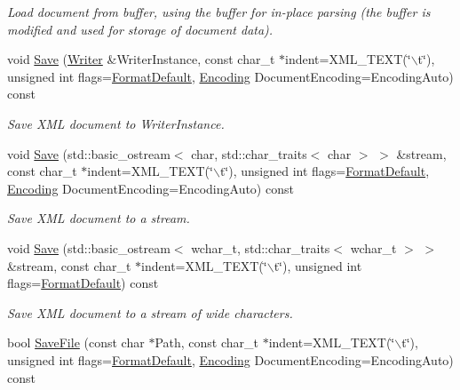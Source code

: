 \begin{DoxyCompactItemize}
\begin{DoxyCompactList}\small\item\em Load document from buffer, using the buffer for in-\/place parsing (the buffer is modified and used for storage of document data). \item\end{DoxyCompactList}\item 
void \hyperlink{classphys_1_1xml_1_1Document_a1e3761e11294b3d526ff13d76ee8be0d}{Save} (\hyperlink{classphys_1_1xml_1_1Writer}{Writer} \&WriterInstance, const char\_\-t $\ast$indent=XML\_\-TEXT(\char`\"{}$\backslash$t\char`\"{}), unsigned int flags=\hyperlink{namespacephys_1_1xml_a08bf6aab51f79929d9097706a5e64408}{FormatDefault}, \hyperlink{namespacephys_1_1xml_a420f5de782438f88160321385bea2015}{Encoding} DocumentEncoding=EncodingAuto) const 
\begin{DoxyCompactList}\small\item\em Save XML document to WriterInstance. \item\end{DoxyCompactList}\item 
void \hyperlink{classphys_1_1xml_1_1Document_aa9f44d46ec6139680ebde26122cc6281}{Save} (std::basic\_\-ostream$<$ char, std::char\_\-traits$<$ char $>$ $>$ \&stream, const char\_\-t $\ast$indent=XML\_\-TEXT(\char`\"{}$\backslash$t\char`\"{}), unsigned int flags=\hyperlink{namespacephys_1_1xml_a08bf6aab51f79929d9097706a5e64408}{FormatDefault}, \hyperlink{namespacephys_1_1xml_a420f5de782438f88160321385bea2015}{Encoding} DocumentEncoding=EncodingAuto) const 
\begin{DoxyCompactList}\small\item\em Save XML document to a stream. \item\end{DoxyCompactList}\item 
void \hyperlink{classphys_1_1xml_1_1Document_a034a5497b68d8531886fdc7a6a67bd7d}{Save} (std::basic\_\-ostream$<$ wchar\_\-t, std::char\_\-traits$<$ wchar\_\-t $>$ $>$ \&stream, const char\_\-t $\ast$indent=XML\_\-TEXT(\char`\"{}$\backslash$t\char`\"{}), unsigned int flags=\hyperlink{namespacephys_1_1xml_a08bf6aab51f79929d9097706a5e64408}{FormatDefault}) const 
\begin{DoxyCompactList}\small\item\em Save XML document to a stream of wide characters. \item\end{DoxyCompactList}\item 
bool \hyperlink{classphys_1_1xml_1_1Document_a888042e75f6dafe4d79107a8b53ae31e}{SaveFile} (const char $\ast$Path, const char\_\-t $\ast$indent=XML\_\-TEXT(\char`\"{}$\backslash$t\char`\"{}), unsigned int flags=\hyperlink{namespacephys_1_1xml_a08bf6aab51f79929d9097706a5e64408}{FormatDefault}, \hyperlink{namespacephys_1_1xml_a420f5de782438f88160321385bea2015}{Encoding} DocumentEncoding=EncodingAuto) const 

\end{DoxyCompactItemize}
